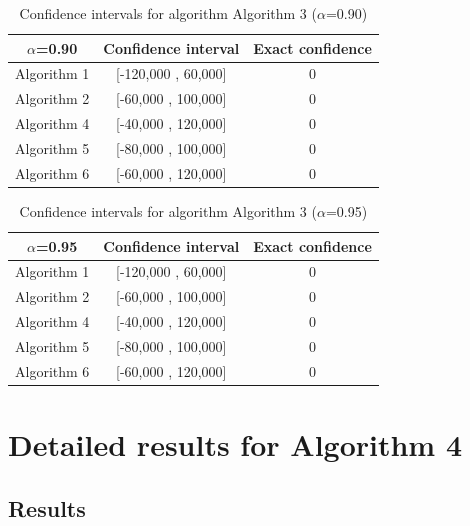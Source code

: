 \documentclass[a4paper,10pt]{article}
\begin{document}
\begin{table}[!htp]
\centering\small
\begin{tabular}{
|c|c|c|}
\hline
 $\alpha$=0.90 & Confidence interval & Exact confidence \\ \hline 
Algorithm 1 & [-120,000 , 60,000] & 0\\ \hline 
Algorithm 2 & [-60,000 , 100,000] & 0\\ \hline 
Algorithm 4 & [-40,000 , 120,000] & 0\\ \hline 
Algorithm 5 & [-80,000 , 100,000] & 0\\ \hline 
Algorithm 6 & [-60,000 , 120,000] & 0\\ \hline 

\end{tabular}
\caption{Confidence intervals for algorithm Algorithm 3 ($\alpha$=0.90)}
\end{table}
\begin{table}[!htp]
\centering\small
\begin{tabular}{
|c|c|c|}
\hline
 $\alpha$=0.95 & Confidence interval & Exact confidence \\ \hline 
Algorithm 1 & [-120,000 , 60,000] & 0\\ \hline 
Algorithm 2 & [-60,000 , 100,000] & 0\\ \hline 
Algorithm 4 & [-40,000 , 120,000] & 0\\ \hline 
Algorithm 5 & [-80,000 , 100,000] & 0\\ \hline 
Algorithm 6 & [-60,000 , 120,000] & 0\\ \hline 

\end{tabular}
\caption{Confidence intervals for algorithm Algorithm 3 ($\alpha$=0.95)}
\end{table}

 \clearpage 


\section{Detailed results for Algorithm 4}


\subsection{Results}
\end{document}
